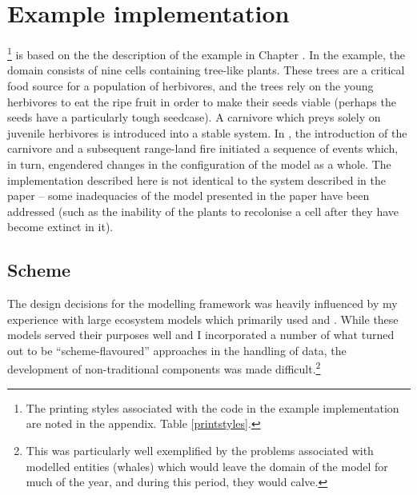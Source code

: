 \section{Example implementation}

\ReModel\footnote{The printing styles associated with the code in the
example implementation are noted in the appendix.
Table \ref{printstyles}.} is based on the the description of the
example in Chapter \Cthree. In the example, the domain consists of
nine cells containing tree-like plants. These trees are a critical
food source for a population of herbivores, and the trees rely on the
young herbivores to eat the ripe fruit in order to make their seeds
viable (perhaps the seeds have a particularly tough seedcase). A
carnivore which preys solely on juvenile herbivores is introduced into
a stable system.  In \Cthree, the introduction of the carnivore and a
subsequent range-land fire initiated a sequence of events which, in
turn, engendered changes in the configuration of the model as a whole.
The implementation described here is not identical to the system
described in the paper -- some inadequacies of the model presented in
the paper have been addressed (such as the inability of the plants to
recolonise a cell after they have become extinct in it).


\subsection{Scheme}
The design decisions for the modelling framework was heavily
influenced by my experience with large ecosystem models which
primarily used \Cpp and \CC.  While these models served their purposes
well and I incorporated a number of what turned out to be
``scheme-flavoured'' approaches in the handling of data, the
development of non-traditional components was made
difficult.\footnote{This was particularly well exemplified by the
problems associated with modelled entities (whales) which would leave
the domain of the model for much of the year, and during this period,
they would calve.}

